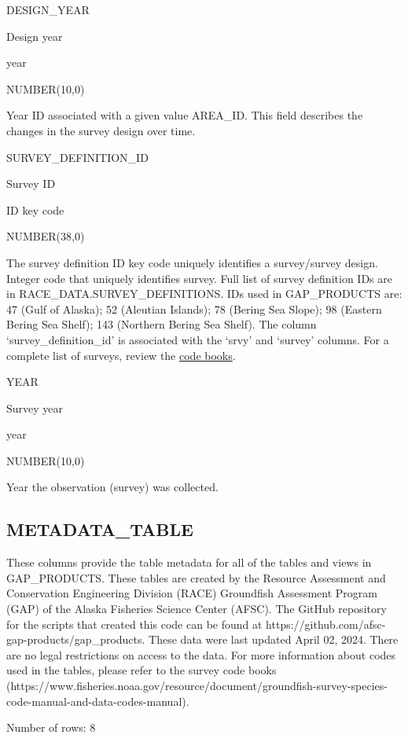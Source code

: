 \documentclass[
  letterpaper,
  oneside,
  open=any]{scrbook}
\begin{document}
DESIGN\_YEAR

Design year

year

NUMBER(10,0)

Year ID associated with a given value AREA\_ID. This field describes the
changes in the survey design over time.

SURVEY\_DEFINITION\_ID

Survey ID

ID key code

NUMBER(38,0)

The survey definition ID key code uniquely identifies a survey/survey
design. Integer code that uniquely identifies survey. Full list of
survey definition IDs are in RACE\_DATA.SURVEY\_DEFINITIONS. IDs used in
GAP\_PRODUCTS are: 47 (Gulf of Alaska); 52 (Aleutian Islands); 78
(Bering Sea Slope); 98 (Eastern Bering Sea Shelf); 143 (Northern Bering
Sea Shelf). The column `survey\_definition\_id' is associated with the
`srvy' and `survey' columns. For a complete list of surveys, review the
\href{https://www.fisheries.noaa.gov/resource/document/groundfish-survey-species-code-manual-and-data-codes-manual}{code
books}.

YEAR

Survey year

year

NUMBER(10,0)

Year the observation (survey) was collected.

\hypertarget{metadata_table}{%
\subsection{METADATA\_TABLE}\label{metadata_table}}

These columns provide the table metadata for all of the tables and views
in GAP\_PRODUCTS. These tables are created by the Resource Assessment
and Conservation Engineering Division (RACE) Groundfish Assessment
Program (GAP) of the Alaska Fisheries Science Center (AFSC). The GitHub
repository for the scripts that created this code can be found at
https://github.com/afsc-gap-products/gap\_products. These data were last
updated April 02, 2024. There are no legal restrictions on access to the
data. For more information about codes used in the tables, please refer
to the survey code books
(https://www.fisheries.noaa.gov/resource/document/groundfish-survey-species-code-manual-and-data-codes-manual).

Number of rows: 8
\end{document}
